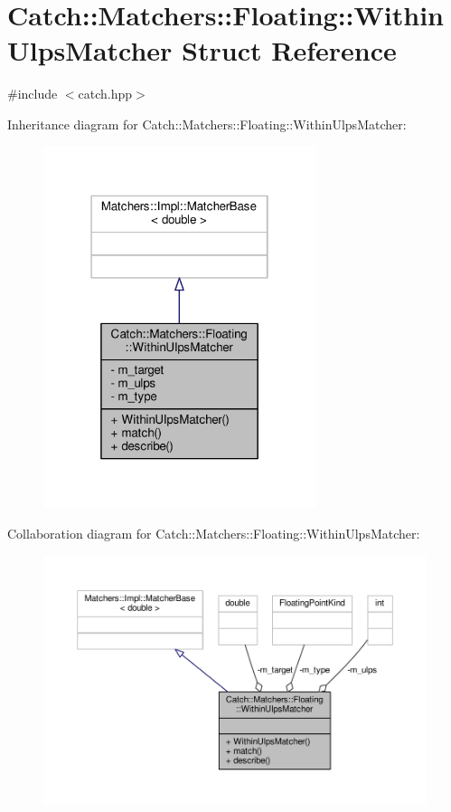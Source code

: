 \hypertarget{struct_catch_1_1_matchers_1_1_floating_1_1_within_ulps_matcher}{\section{Catch\-:\-:Matchers\-:\-:Floating\-:\-:Within\-Ulps\-Matcher Struct Reference}
\label{struct_catch_1_1_matchers_1_1_floating_1_1_within_ulps_matcher}
}


{\ttfamily \#include $<$catch.\-hpp$>$}



Inheritance diagram for Catch\-:\-:Matchers\-:\-:Floating\-:\-:Within\-Ulps\-Matcher\-:
\nopagebreak
\begin{figure}[H]
\begin{center}
\leavevmode
\includegraphics[width=226pt]{struct_catch_1_1_matchers_1_1_floating_1_1_within_ulps_matcher__inherit__graph}
\end{center}
\end{figure}


Collaboration diagram for Catch\-:\-:Matchers\-:\-:Floating\-:\-:Within\-Ulps\-Matcher\-:
\nopagebreak
\begin{figure}[H]
\begin{center}
\leavevmode
\includegraphics[width=350pt]{struct_catch_1_1_matchers_1_1_floating_1_1_within_ulps_matcher__coll__graph}
\end{center}
\end{figure}
